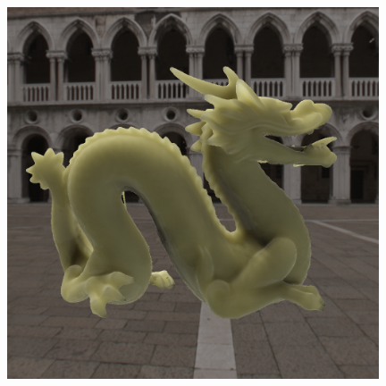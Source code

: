 \documentclass{beamer}
\begin{document}
\begin{frame}
\begin{columns}
\begin{column}{0.33\textwidth}
				\end{column}
    \begin{column}{0.33\textwidth}
      \centering
		\includegraphics[width=0.9\textwidth]{skymap}
    \end{column}
​  \end{columns}
\end{frame}
\end{document}
